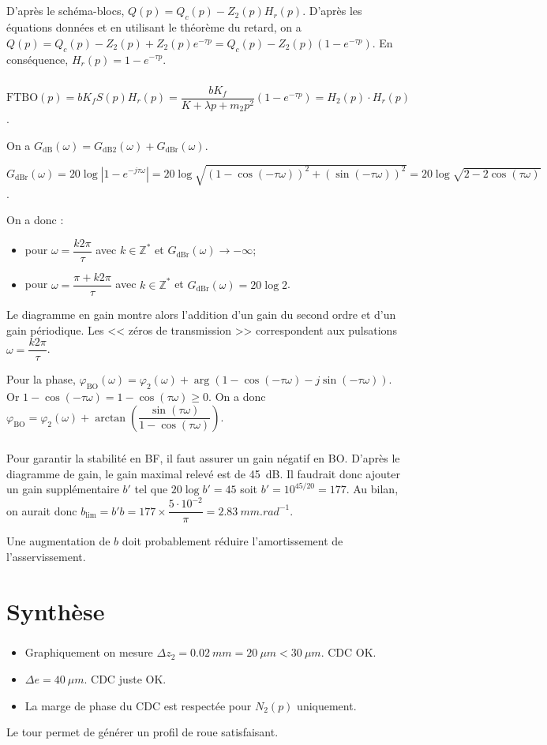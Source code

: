 \documentclass[10pt,fleqn]{article} %
\begin{document}
\subparagraph{}

D'après le schéma-blocs, $Q(p)=Q_c(p)-Z_2(p)H_r(p)$. 
D'après les équations données et en utilisant le théorème du retard, on a $Q(p)=Q_c(p)-Z_2(p)+Z_2(p)e^{-\tau p}=Q_c(p)-Z_2(p)\left(1-e^{-\tau p}\right)$. En conséquence, $H_r(p)=1-e^{-\tau p}$.


\subparagraph{}
$\text{FTBO}(p)=bK_f S(p)H_r(p)= \dfrac{bK_f}{K+\lambda p +m_2 p^2}\left(1-e^{-\tau p}\right) = H_2(p)\cdot H_r(p)$.

On a $G_{\text{dB}}(\omega)=G_{\text{dB2}}(\omega) + G_{\text{dBr}}(\omega)$.

$G_{\text{dBr}}(\omega) = 20\log \left|1-e^{-j\tau \omega} \right|=20\log 
\sqrt{\left( 1-\cos \left(-\tau \omega \right)\right)^2 + \left( \sin \left(-\tau \omega \right)\right)^2 } = 20\log \sqrt{2-2\cos \left( \tau \omega \right)}$.

On a donc :
\begin{itemize}
\item pour $\omega=\dfrac{k2\pi }{\tau}$ avec $k\in \mathbb{Z}^*$ et $G_{\text{dBr}}(\omega) \to -\infty $;
\item pour $\omega=\dfrac{\pi + k2\pi }{\tau}$ avec $k\in \mathbb{Z}^*$ et $G_{\text{dBr}}(\omega) = 20 \log 2$.
\end{itemize}

Le diagramme en gain montre alors l'addition d'un gain du second ordre et d'un gain périodique. Les << zéros de transmission >> correspondent aux pulsations $\omega=\dfrac{k2\pi }{\tau}$.

Pour la phase, $\varphi_{\text{BO}}\left( \omega\right)=\varphi_2\left( \omega\right)+\arg\left( 1-\cos\left( -\tau\omega\right) - j\sin\left(-\tau\omega\right)\right)$. Or $1-\cos\left( -\tau\omega\right) = 1-\cos\left( \tau \omega \right) \geq 0$. On a donc 
 $\varphi_{\text{BO}}=\varphi_2\left( \omega\right)+\arctan \left(\dfrac{\sin\left( \tau\omega\right)}{1-\cos\left( \tau\omega\right)} \right)$.

\subparagraph{}
Pour garantir la stabilité en BF, il faut assurer un gain négatif en BO. D'après le diagramme de gain, le gain maximal relevé est de \SI{45}{dB}. Il faudrait donc ajouter un gain supplémentaire $b'$ tel que $20\log b' = 45$ soit $b'=10^{45/20}=177$. Au bilan, on aurait donc $b_{\text{lim}}=b' b = 177\times \dfrac{5\cdot 10^{-2}}{\pi}=
\SI{2,83}{mm.rad^{-1}}$.

Une augmentation de $b$ doit probablement réduire l'amortissement de l'asservissement. 
\section{Synthèse}

\subparagraph{}%
\begin{itemize}
\item Graphiquement on mesure $\Delta z_2 = \SI{0,02}{mm}=\SI{20}{\mu m}<\SI{30}{\mu m}$. CDC OK. 
\item $\Delta e = \SI{40}{\mu m}$. CDC juste OK. 
\item La marge de phase du CDC est respectée pour $N_2(p)$ uniquement. 
\end{itemize}

Le tour permet de générer un profil de roue satisfaisant. 
\end{document}
